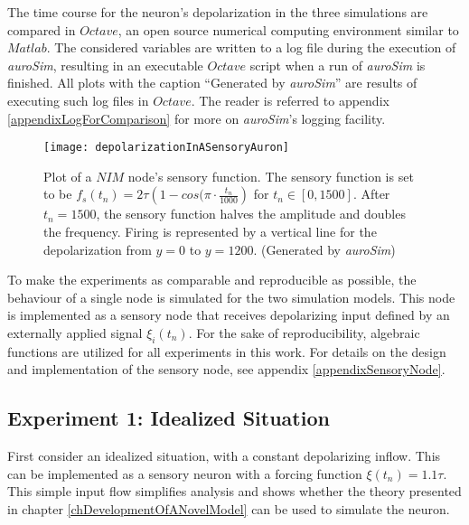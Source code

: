 	The time course for the neuron's depolarization in the three simulations are compared in $Octave$, an open source numerical computing environment similar to $Matlab$.
	The considered variables are written to a log file during the execution of \emph{auroSim}, resulting in an executable $Octave$ script when a run of \emph{auroSim} is finished.
	All plots with the caption ``Generated by \emph{auroSim}'' are results of executing such log files in $Octave$. %
	The reader is referred to appendix \ref{appendixLogForComparison} for more on \emph{auroSim}'s logging facility.


\begin{figure}[htb!p]
	\centering
	\centerline{ %
	\texttt{[image: depolarizationInASensoryAuron]}
	}
	\caption[The depolarization of a sensory neuron with a sinusoidal algebraic sensory function.]{
			Plot of a $NIM$ node's sensory function.
			The sensory function is set to be $f_s(t_n) = 2\tau\left(1-cos(\pi \cdot \frac{t_n}{1000}\right)$ for $t_n \in [0, 1500]$. After $t_n=1500$, the sensory function halves the amplitude and doubles the frequency.
			Firing is represented by a vertical line for the depolarization from $y=0$ to $y=1200$.
			(Generated by \emph{auroSim}) \cite{FDP_report}
			}
\end{figure}


	To make the experiments as comparable and reproducible as possible, the behaviour of a single node is simulated for the two simulation models.
	This node is implemented as a sensory node that receives depolarizing input defined by an externally applied signal $\xi_i(t_n)$. 
	For the sake of reproducibility, algebraic functions are utilized for all experiments in this work.
	For details on the design and implementation of the sensory node, see appendix \ref{appendixSensoryNode}.

	\subsection{Experiment 1: Idealized Situation}
	First consider an idealized situation, with a constant depolarizing inflow.
	This can be implemented as a sensory neuron with a forcing function $\xi(t_n)=1.1 \tau$. 
	This simple input flow simplifies analysis and shows whether the theory presented in chapter \ref{chDevelopmentOfANovelModel} can be used to simulate the neuron.

